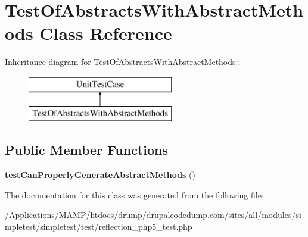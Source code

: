 \hypertarget{class_test_of_abstracts_with_abstract_methods}{
\section{TestOfAbstractsWithAbstractMethods Class Reference}
\label{class_test_of_abstracts_with_abstract_methods}
}
Inheritance diagram for TestOfAbstractsWithAbstractMethods::\begin{figure}[H]
\begin{center}
\leavevmode
\includegraphics[height=2cm]{class_test_of_abstracts_with_abstract_methods}
\end{center}
\end{figure}
\subsection*{Public Member Functions}
\begin{DoxyCompactItemize}
\item 
\hypertarget{class_test_of_abstracts_with_abstract_methods_aa5e6f7ae2cd04f21d778f3be5cd843da}{
{\bfseries testCanProperlyGenerateAbstractMethods} ()}
\label{class_test_of_abstracts_with_abstract_methods_aa5e6f7ae2cd04f21d778f3be5cd843da}

\end{DoxyCompactItemize}


The documentation for this class was generated from the following file:\begin{DoxyCompactItemize}
\item 
/Applications/MAMP/htdocs/drump/drupalcodedump.com/sites/all/modules/simpletest/simpletest/test/reflection\_\-php5\_\-test.php\end{DoxyCompactItemize}
